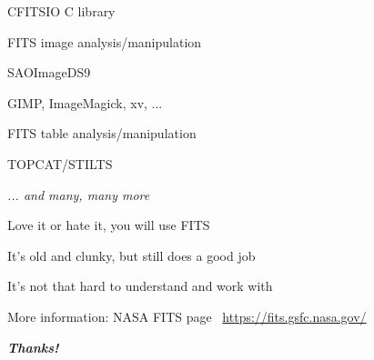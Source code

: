 \documentclass[20pt,landscape]{foils}
\newif\ifrubric
\newcommand{\burl}[1]{{\color{blue}\url{#1}}}
\begin{document}
\begin{list1}
\begin{list2}
    \item CFITSIO C library
  \end{list2}
\vspace*{-0.2cm}
  \item FITS image analysis/manipulation
\vspace*{-0.2cm}
  \begin{list2}
\vspace*{-0.2cm}
    \item SAOImageDS9
\vspace*{-0.2cm}
    \item GIMP, ImageMagick, xv, ...
  \end{list2}
\vspace*{-0.2cm}
  \item FITS table analysis/manipulation
\vspace*{-0.2cm}
  \begin{list2}
\vspace*{-0.2cm}
    \item TOPCAT/STILTS
  \end{list2}
\vspace*{-0.2cm}
  \item[] \hspace*{8cm} {\color{darkgrey}\sl ... and many, many more}
\end{list1}


\begin{list1}
  \item Love it or hate it, you will use FITS
  \item It's old and clunky, but still does a good job
  \item It's not that hard to understand and work with
  \item More information: NASA FITS page \ \burl{https://fits.gsfc.nasa.gov/}
\end{list1}

\vspace{6cm}
\begin{center}
  {\color{darkred}\Huge\bf\sl Thanks!}
\end{center}

\label{lastPage}

\ifrubric
\end{document}
